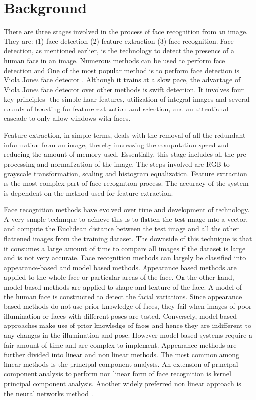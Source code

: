 \documentclass[conference]{IEEEtran}
\begin{document}
\section{Background}
\label{sec: 2.Background}

There are three stages involved in the process of face recognition from an image. They are: (1) face detection (2) feature extraction (3) face recognition. Face detection, as mentioned earlier, is the technology to detect the presence of a human face in an image. Numerous methods can be used to perform face detection and One of the most popular method is to perform face detection is Viola Jones face detector \cite{zafeiriou2015survey}. Although it trains at a slow pace, the advantage of Viola Jones face detector over other methods is swift detection. It involves four key principles- the simple haar features, utilization of integral images and several rounds of boosting for feature extraction and selection, and an attentional cascade to only allow windows with faces\cite{zafeiriou2015survey}.

Feature extraction, in simple terms, deals with the removal of all the redundant information from an image, thereby increasing the computation speed and reducing the amount of memory used. Essentially, this stage includes all the pre-processing and normalization of the image. The steps involved are RGB to grayscale transformation, scaling and histogram equalization. Feature extraction is the most complex part of face recognition process. The accuracy of the system is dependent on the method used for feature extraction.

Face recognition methods have evolved over time and development of technology. A very simple technique to achieve this is to flatten the test image into a vector, and compute the Euclidean distance between the test image and all the other flattened images from the training dataset. The downside of this technique is that it consumes a large amount of time to compare all images if the dataset is large and is not very accurate. Face recognition methods can largely be classified into appearance-based and model based methods. Appearance based methods are applied to the whole face or particular areas of the face. On the other hand, model based methods are applied to shape and texture of the face. A model of the human face is constructed to detect the facial variations. Since appearance based methods do not use prior knowledge of faces, they fail when images of poor illumination or faces with different poses are tested. Conversely, model based approaches  make use of prior knowledge of faces and hence they are indifferent to any changes in the illumination and pose. However model based systems require a fair amount of time and are complex to implement. Appearance methods are further divided into linear and non linear methods. The most common among linear methods is the principal component analysis. An extension of principal component analysis to perform non linear form of face recognition is kernel principal component analysis. Another widely preferred non linear approach is the neural networks method \cite{agrawal2015evaluation}.
\end{document}
